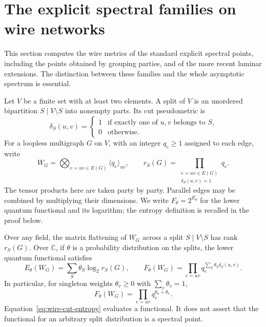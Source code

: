 \section{The explicit spectral families on wire networks}
\label{sec:explicit-spectrum}
This section computes the wire metrics of the standard explicit spectral points, including the points obtained by grouping parties, and of the more recent laminar extensions.  The distinction between these families and the whole asymptotic spectrum is essential.

Let $V$ be a finite set with at least two elements.  A split of $V$ is an unordered bipartition $S\mid V\setminus S$ into nonempty parts.  Its cut pseudometric is
\[
 \delta_S(u,v)=\begin{cases}1&\text{if exactly one of $u,v$ belongs to $S$,}\\0&\text{otherwise.}\end{cases}
\]
For a loopless multigraph $G$ on $V$, with an integer $q_e\geq1$ assigned to each edge, write
\[
 W_G=\mathop{\bigotimes}_{e=uv\in E(G)}\langle q_e\rangle_{uv},
 \qquad
 r_S(G)=\prod_{\substack{e=uv\in E(G)\\\delta_S(u,v)=1}}q_e.
\]
The tensor products here are taken party by party.  Parallel edges may be combined by multiplying their dimensions. We write $F_\theta=2^{E_\theta}$ for the lower quantum functional and its logarithm; the entropy definition is recalled in the proof below.

\begin{proposition}
\label{prop:wire-evaluations}
Over any field, the matrix flattening of $W_G$ across a split $S\mid V\setminus S$ has rank $r_S(G)$.  Over $\mathbb C$, if $\theta$ is a probability distribution on the splits, the lower quantum functional satisfies
\begin{equation}
 E_\theta(W_G)=\sum_S\theta_S\log_2 r_S(G),
 \qquad
 F_\theta(W_G)=\prod_{e=uv}q_e^{\sum_S\theta_S\delta_S(u,v)}.
 \label{eq:wire-cut-entropy}
\end{equation}
In particular, for singleton weights $\theta_v\geq0$ with $\sum_v\theta_v=1$,
\begin{equation}
 F_\theta(W_G)=\prod_{e=uv}q_e^{\theta_u+\theta_v}.
 \label{eq:wire-star}
\end{equation}
Equation~\eqref{eq:wire-cut-entropy} evaluates a functional.  It does not assert that the functional for an arbitrary split distribution is a spectral point.
\end{proposition}

